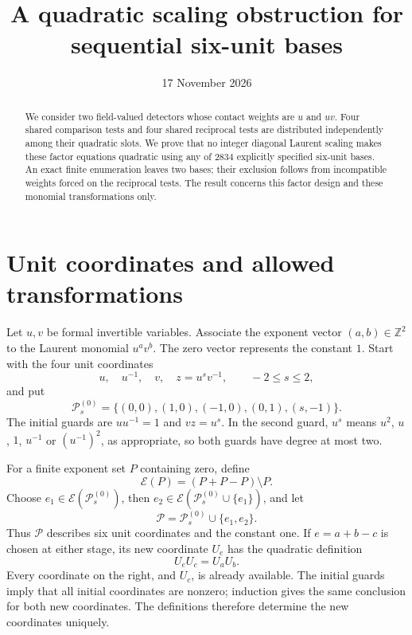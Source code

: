 \documentclass[11pt,a4paper]{article}
\title{A quadratic scaling obstruction for sequential six-unit bases}
\author{}\date{17 November 2026}
\newcommand{\Z}{\mathbb Z}
\newcommand{\Pset}{\mathcal P}
\begin{document}
\maketitle
\begin{abstract}
We consider two field-valued detectors whose contact weights are $u$ and
$uv$. Four shared comparison tests and four shared reciprocal tests are
distributed independently among their quadratic slots. We prove that
no integer diagonal Laurent scaling makes these factor equations
quadratic using any of $2834$ explicitly specified six-unit bases.
An exact finite enumeration leaves two bases; their exclusion follows
from incompatible weights forced on the reciprocal tests. The result
concerns this factor design and these monomial transformations only.
\end{abstract}

\section{Unit coordinates and allowed transformations}

Let $u,v$ be formal invertible variables. Associate the exponent vector
$(a,b)\in\Z^2$ to the Laurent monomial $u^av^b$. The zero vector
represents the constant $1$. Start with the four unit coordinates
\begin{equation}\label{eq:initial}
u,\quad u^{-1},\quad v,\quad z=u^sv^{-1},
\qquad -2\le s\le2,
\end{equation}
and put
\[
 \Pset_s^{(0)}=\{(0,0),(1,0),(-1,0),(0,1),(s,-1)\}.
\]
The initial guards are $u u^{-1}=1$ and $vz=u^s$. In the second
guard, $u^s$ means $u^2$, $u$, $1$, $u^{-1}$ or $(u^{-1})^2$,
as appropriate, so both guards have degree at most two.

For a finite exponent set $P$ containing zero, define
\[
 \mathcal E(P)=(P+P-P)\setminus P.
\]
Choose $e_1\in\mathcal E(\Pset_s^{(0)})$, then
$e_2\in\mathcal E(\Pset_s^{(0)}\cup\{e_1\})$, and let
\begin{equation}\label{eq:finalP}
 \Pset=\Pset_s^{(0)}\cup\{e_1,e_2\}.
\end{equation}
Thus $\Pset$ describes six unit coordinates and the constant one.
If $e=a+b-c$ is chosen at either stage, its new coordinate $U_e$
has the quadratic definition
\[
                         U_eU_c=U_aU_b.
\]
Every coordinate on the right, and $U_c$, is already available.
The initial guards imply that all initial coordinates are nonzero;
induction gives the same conclusion for both new coordinates.
The definitions therefore determine the new coordinates uniquely.
\end{document}
